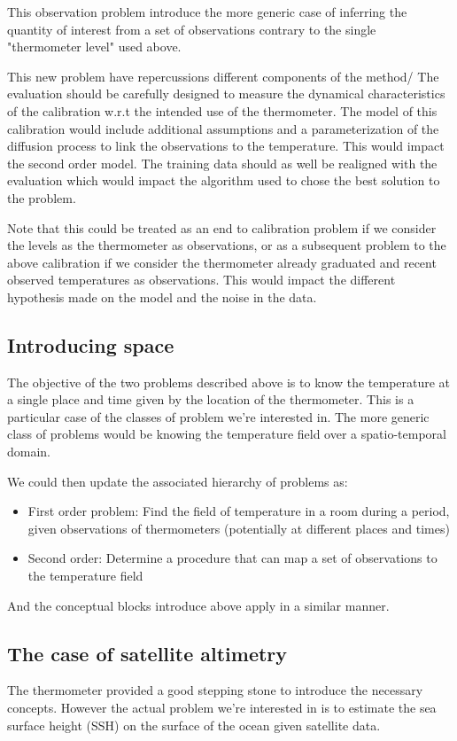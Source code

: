 \begin{bibunit}
This observation problem introduce the more generic case of inferring the quantity of interest from a set of observations contrary to the single "thermometer level" used above.

This new problem have repercussions different components of the method/
The evaluation should be carefully designed to measure the dynamical characteristics of the calibration w.r.t the intended use of the thermometer.
The model of this calibration would include additional assumptions and a parameterization of the diffusion process to link the observations to the temperature. This would impact the second order model.
The training data should as well be realigned with the evaluation which would impact the algorithm used to chose the best solution to the problem.

Note that this could be treated as an end to calibration problem if we consider the levels as the thermometer as observations, or as a subsequent problem to the above calibration if we consider the thermometer already graduated and recent observed temperatures as observations. This would impact the different hypothesis made on the model and the noise in the data.


\subsection{Introducing space}
  The objective of the two problems described above is to know the temperature at a single place and time given by the location of the thermometer. 
  This is a particular case of the classes of problem we're interested in.
  The more generic class of problems would be knowing the temperature field over a spatio-temporal domain.

We could then update the associated hierarchy of problems as:
\begin{itemize}
    \item First order problem: Find the field of temperature in a room during a period, given observations of thermometers (potentially at different places and times)
    \item Second order: Determine a procedure that can map a set of observations to the temperature field
\end{itemize}

And the conceptual blocks introduce above apply in a similar manner.

\subsection{The case of satellite altimetry}
  The thermometer provided a good stepping stone to introduce the necessary concepts.
  However the actual problem we're interested in is to estimate the sea surface height (SSH) on the surface of the ocean given satellite data.


\end{bibunit}
